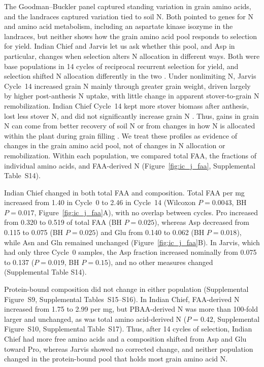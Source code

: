\documentclass[namedate,unnumsec,webpdf,contemporary,large]{oup-authoring-template}
\begin{document}
The Goodman--Buckler panel captured standing variation in grain amino acids, and the landraces captured variation tied to soil N. Both pointed to genes for N and amino acid metabolism, including an aspartate kinase isozyme in the landraces, but neither shows how the grain amino acid pool responds to selection for yield. Indian Chief and Jarvis let us ask whether this pool, and Asp in particular, changes when selection alters N allocation in different ways. Both were base populations in 14 cycles of reciprocal recurrent selection for yield, and selection shifted N allocation differently in the two \citep{Moll1994}. Under nonlimiting N, Jarvis Cycle~14 increased grain N mainly through greater grain weight, driven largely by higher post-anthesis N uptake, with little change in apparent stover-to-grain N remobilization. Indian Chief Cycle~14 kept more stover biomass after anthesis, lost less stover N, and did not significantly increase grain N \citep{Moll1994}. Thus, gains in grain N can come from better recovery of soil N or from changes in how N is allocated within the plant during grain filling \citep{Mueller2019NUE}. We treat these profiles as evidence of changes in the grain amino acid pool, not of changes in N allocation or remobilization. Within each population, we compared total FAA, the fractions of individual amino acids, and FAA-derived N (Figure~\ref{fig:ic_j_faa}, Supplemental Table~S14).

Indian Chief changed in both total FAA and composition. Total FAA per mg increased from 1.40 in Cycle~0 to 2.46 in Cycle~14 (Wilcoxon $P = 0.0043$, BH $P = 0.017$, Figure~\ref{fig:ic_j_faa}A), with no overlap between cycles. Pro increased from 0.320 to 0.519 of total FAA (BH $P = 0.025$), whereas Asp decreased from 0.115 to 0.075 (BH $P = 0.025$) and Glu from 0.140 to 0.062 (BH $P = 0.018$), while Asn and Gln remained unchanged (Figure~\ref{fig:ic_j_faa}B). In Jarvis, which had only three Cycle~0 samples, the Asp fraction increased nominally from 0.075 to 0.137 ($P = 0.019$, BH $P = 0.15$), and no other measures changed (Supplemental Table S14).

Protein-bound composition did not change in either population (Supplemental Figure~S9, Supplemental Tables~S15--S16). In Indian Chief, FAA-derived N increased from 1.75 to 2.99 per mg, but PBAA-derived N was more than 100-fold larger and unchanged, as was total amino acid-derived N ($P = 0.42$, Supplemental Figure~S10, Supplemental Table~S17). Thus, after 14 cycles of selection, Indian Chief had more free amino acids and a composition shifted from Asp and Glu toward Pro, whereas Jarvis showed no corrected change, and neither population changed in the protein-bound pool that holds most grain amino acid N.
\end{document}
